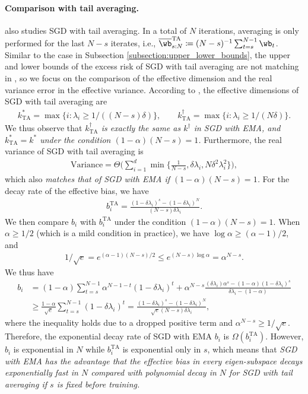 \documentclass[11pt]{article}
\newcommand{\owb}{\overline{\wb}}
\begin{document}
\paragraph{Comparison with tail averaging.}
\citet{zou2021benign} also studies SGD with tail averaging. In a total of $N$ iterations, averaging is only performed for the last $N-s$ iterates, i.e.,
$\owb_{s:N}^{\mathrm{TA}}\coloneqq(N-s)^{-1}\sum_{t=s}^{N-1}\wb_t$.
Similar to the case in Subsection \ref{subsection:upper_lower_bounds}, the upper and lower bounds of the excess risk of SGD with tail averaging are not matching in \citet{zou2021benign}, so we focus on the comparison of the effective dimension and the real variance error in the effective variance. According to \citet{zou2021benign}, the effective dimensions of SGD with tail averaging are
\begin{align*}
k^*_{\mathrm{TA}}=\max\{i:\lambda_i\ge1/((N-s)\delta)\},\qquad k^\dagger_{\mathrm{TA}}=\max\{i:\lambda_i\ge1/(N\delta)\}.
\end{align*}
We thus observe that \emph{$k^\dagger_{\mathrm{TA}}$ is exactly the same as $k^\dagger$ in SGD with EMA, and $k^*_{\mathrm{TA}}=k^*$ under the condition $(1-\alpha)(N-s)=1$.} Furthermore, the real variance of SGD with tail averaging is
\begin{align*}
\mathrm{Variance}=\Theta\bigg(\sum_{i=1}^d\min\Big\{\frac1{N-s}, \delta\lambda_i, N\delta^2\lambda_i^2\Big\}\bigg),
\end{align*}
which also \emph{matches that of SGD with EMA if $(1-\alpha)(N-s)=1$.} For the decay rate of the effective bias, we have
\begin{align*}
b_i^{\mathrm{TA}}=\frac{(1-\delta\lambda_i)^s-(1-\delta\lambda_i)^N}{(N-s)\delta\lambda_i}.
\end{align*}
We then compare $b_i$ with $b_i^{\mathrm{TA}}$ under the condition $(1-\alpha)(N-s)=1$. When $\alpha\ge1/2$ (which is a mild condition in practice), we have $\log\alpha\ge(\alpha-1)/2$, and
\begin{align*}
1/\sqrt e=e^{(\alpha-1)(N-s)/2}\le e^{(N-s)\log\alpha}=\alpha^{N-s}.
\end{align*}
We thus have
\begin{align*}
b_i&=(1-\alpha)\sum_{t=s}^{N-1}\alpha^{N-1-t}(1-\delta\lambda_i)^t+\alpha^{N-s}\frac{(\delta\lambda_i)\alpha^s-(1-\alpha)(1-\delta\lambda_i)^s}{\delta\lambda_i-(1-\alpha)}\\
&\ge\frac{1-\alpha}{\sqrt e}\sum_{t=s}^{N-1}(1-\delta\lambda_i)^t=\frac{(1-\delta\lambda_i)^s-(1-\delta\lambda_i)^N}{\sqrt e(N-s)\delta\lambda_i},
\end{align*}
where the inequality holds due to a dropped positive term and $\alpha^{N-s}\ge 1/\sqrt e$.
Therefore, the exponential decay rate of SGD with EMA $b_i$ is $\Omega(b_i^\mathrm{TA})$. However, $b_i$ is exponential in $N$ while $b_i^{\mathrm{TA}}$ is exponential only in $s$, which means that \emph{SGD with EMA has the advantage that the effective bias in every eigen-subspace decays exponentially fast in $N$ compared with polynomial decay in $N$ for SGD with tail averaging if $s$ is fixed before training.}
\end{document}
